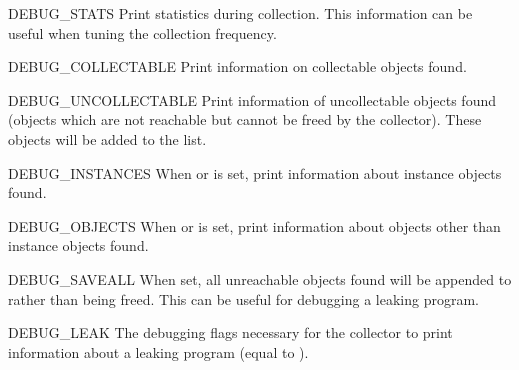 \begin{datadesc}{DEBUG_STATS}
Print statistics during collection.  This information can
be useful when tuning the collection frequency.
\end{datadesc}

\begin{datadesc}{DEBUG_COLLECTABLE}
Print information on collectable objects found.
\end{datadesc}

\begin{datadesc}{DEBUG_UNCOLLECTABLE}
Print information of uncollectable objects found (objects which are
not reachable but cannot be freed by the collector).  These objects
will be added to the  list.
\end{datadesc}

\begin{datadesc}{DEBUG_INSTANCES}
When  or  is
set, print information about instance objects found.
\end{datadesc}

\begin{datadesc}{DEBUG_OBJECTS}
When  or  is
set, print information about objects other than instance objects found.
\end{datadesc}

\begin{datadesc}{DEBUG_SAVEALL}
When set, all unreachable objects found will be appended to
 rather than being freed.  This can be useful for debugging
a leaking program.
\end{datadesc}

\begin{datadesc}{DEBUG_LEAK}
The debugging flags necessary for the collector to print
information about a leaking program (equal to ).
\end{datadesc}
